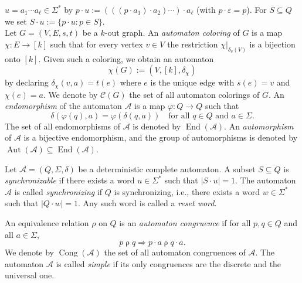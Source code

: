 \documentclass[a4paper,10pt]{amsart}
\theoremstyle{plain}
\theoremstyle{definition}
\newtheorem{definition}[theorem]{Definition}
\DeclareMathOperator{\Aut}{Aut}
\DeclareMathOperator{\End}{End}
\DeclareMathOperator{\Cong}{Cong}
\begin{document}
$u=a_1\cdots a_\ell\in\Sigma^*$ by $p\cdot u:=(((p\cdot a_1)\cdot a_2)\cdots)\cdot a_\ell$ (with
$p\cdot\varepsilon=p$). For $S\subseteq Q$ we set $S\cdot u:=\{p\cdot u: p\in S\}$.
\\
Let $G=(V,E,s,t)$ be a $k$-out graph.
An \emph{automaton coloring} of $G$ is a map $\chi:E\to[k]$ such that for every vertex $v\in V$ the restriction
$\chi\big|_{\delta_v(V)}$ is a bijection onto $[k]$.
Given such a coloring, we obtain an automaton
\[
  \chi(G):=(V,[k],\delta_\chi)
\]
by declaring $\delta_\chi(v,a)=t(e)$ where $e$ is the unique edge with $s(e)=v$ and $\chi(e)=a$.
We denote by $\mathcal C(G)$ the set of all automaton colorings of $G$.
An \emph{endomorphism} of the automaton $\mathcal{A}$ is a map $\varphi : Q \to Q$ such that
\[
\delta(\varphi(q), a) = \varphi(\delta(q,a))
\quad
\text{for all } q \in Q \text{ and } a \in \Sigma.
\]
The set of all endomorphisms of $\mathcal{A}$ is denoted by $\End(\mathcal{A})$.
An \emph{automorphism} of $\mathcal{A}$ is a bijective endomorphism, and the group of automorphisms is denoted by $\Aut(\mathcal{A}) \subseteq \End(\mathcal{A})$.

 Let $\mathcal A=(Q,\Sigma,\delta)$ be a deterministic complete automaton. A subset $S\subseteq Q$ is \emph{synchronizable} if there exists a word $u\in\Sigma^*$ such that $|S\cdot u|=1$. The automaton $\mathcal A$ is called \emph{synchronizing} if $Q$ is synchronizing, i.e.,  there exists a word $w\in\Sigma^*$ such that \(|Q\cdot w|=1.\) Any such word is called a \emph{reset word}. 
 
 An equivalence relation $\rho$ on $Q$ is an \emph{automaton congruence} if for all $p,q\in Q$ and all $a\in\Sigma$,
\[
p\mathrel{\rho}q \Longrightarrow p\cdot a \mathrel{\rho}q\cdot a.
\]
We denote by $\Cong(\mathcal A)$ the set of all automaton congruences of $\mathcal A$. The automaton $\mathcal A$ is called \emph{simple} if its only congruences are the discrete and the universal one.


\end{document}
